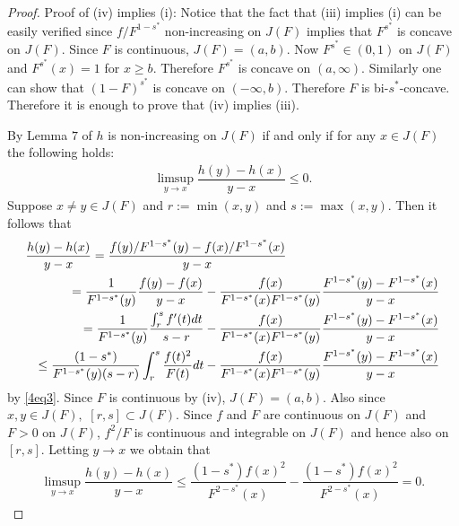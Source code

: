 \documentclass[11pt]{amsart}
\numberwithin{equation}{section}
\theoremstyle{definition}\newtheorem{definition}{Definition}
\theoremstyle{remark}\newtheorem{assumption}{Assumption}
\theoremstyle{remark}\newtheorem{remark}{Remark}
\theoremstyle{definition}\newtheorem{example}{Example}
\theoremstyle{plain}\newtheorem{question}{Question}
\theoremstyle{plain}\newtheorem{theorem}{Theorem}
\theoremstyle{plain}\newtheorem{lemma}{Lemma}
\theoremstyle{plain}\newtheorem{proposition}{Proposition}
\theoremstyle{plain}\newtheorem{corollary}{Corollary}
\theoremstyle{plain}\newtheorem{conjecture}{Conjecture}
\begin{document}
\begin{proof}
     
Proof of (iv) implies (i):
 Notice that the fact that (iii) implies (i) can be easily verified  since $f/F^{1-s^*}$ non-increasing on 
 $J(F)$ implies that   $F^{s^*}$ is concave on $J(F).$ Since $F$ is continuous, $J(F)=(a,b)$.  
 Now $F^{s^*}\in(0,1)$ on $J(F)$ and $F^{s^*}(x)=1$ for $x\geq b$. 
 Therefore $F^{s^*}$ is concave on $(a,\infty)$.
 Similarly one can show that $(1-F)^{s^*}$ is concave on $(-\infty,b)$.
 Therefore $F$ is bi-$s^*$-concave. Therefore it is enough to prove that (iv) implies (iii).
 
 
 By Lemma $7$ of \cite{DuembgenKW:2017} $h$ is non-increasing on $J(F)$ 
 if and only if for any $x\in J(F)$ the following holds:
 \begin{eqnarray*}
 \limsup_{y\to x}\dfrac{h(y)-h(x)}{y-x}\leq 0.
 \end{eqnarray*}
 Suppose $x\neq y\in J(F)$ and $r:=\min(x,y)$ and $s:=\max(x,y).$ Then it follows that
 \begin{eqnarray*}
\lefteqn{\dfrac{h(y)-h(x)}{y-x} =  \dfrac{f(y)/F^{1-s^*}(y)-f(x)/F^{1-s^*}(x)}{y-x}} \\
     && = \dfrac{1}{F^{1-s^*}(y)}\dfrac{f(y)-f(x)}{y-x}
                 -\dfrac{f(x)}{F^{1-s^*}(x)F^{1-s^*}(y)}\dfrac{F^{1-s^*}(y)-F^{1-s^*}(x)}{y-x}\\
     && = \dfrac{1}{F^{1-s^*}(y)}\dfrac{\int_{r}^{s}f'(t)dt}{s-r}
                 -\dfrac{f(x)}{F^{1-s^*}(x)F^{1-s^*}(y)}\dfrac{F^{1-s^*}(y)-F^{1-s^*}(x)}{y-x}\\
     && \leq  \dfrac{(1-s^*)}{F^{1-s^*}(y)(s-r)}\int_{r}^{s}\dfrac{f(t)^2}{F(t)}dt
                 -\dfrac{f(x)}{F^{1-s^*}(x)F^{1-s^*}(y)}\dfrac{F^{1-s^*}(y)-F^{1-s^*}(x)}{y-x}
 \end{eqnarray*}
  by \eqref{4eq3}. 
  Since $F$ is continuous by (iv), $J(F)=(a,b)$. 
  Also since $x,y\in J(F),$ $[r,s]\subset J(F)$.  Since $f$ and $F$ are continuous on 
  $J(F)$ and $F>0$ on $J(F)$,  $f^2/F$ is continuous and integrable on $J(F)$ and hence also on $[r,s]$.    
  Letting $y\to x$ we obtain that
 \begin{eqnarray*}
     \limsup_{y\to x}\dfrac{h(y)-h(x)}{y-x}\leq \dfrac{(1-s^*)f(x)^2}{F^{2-s^*}(x)}-\dfrac{(1-s^*)f(x)^2}{F^{2-s^*}(x)}=0 .
 \end{eqnarray*}

\end{proof}
\end{document}
